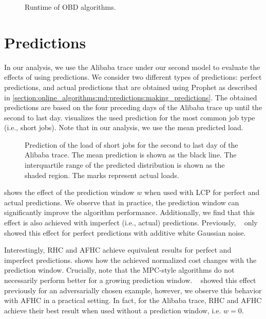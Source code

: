 \begin{figure}
    \centering
    
    \caption{Runtime of OBD algorithms.}\label{fig:case_studies:md:obd:runtimes}
\end{figure}

\section{Predictions}

In our analysis, we use the Alibaba trace under our second model to evaluate the effects of using predictions. We consider two different types of predictions: perfect predictions, and actual predictions that are obtained using Prophet as described in \cref{section:online_algorithms:md:predictions:making_predictions}. The obtained predictions are based on the four preceding days of the Alibaba trace up until the second to last day.  visualizes the used prediction for the most common job type (i.e., short jobs). Note that in our analysis, we use the mean predicted load.

\begin{figure}
    \centering
    
    \caption{Prediction of the load of short jobs for the second to last day of the Alibaba trace. The mean prediction is shown as the black line. The interquartile range of the predicted distribution is shown as the shaded region. The marks represent actual loads.}\label{fig:case_studies:predictions:prediction}
\end{figure}

 shows the effect of the prediction window $w$ when used with LCP for perfect and actual predictions. We observe that in practice, the prediction window can significantly improve the algorithm performance. Additionally, we find that this effect is also achieved with imperfect (i.e., actual) predictions. Previously, \citeauthor{Lin2011}~\cite{Lin2011} only showed this effect for perfect predictions with additive white Gaussian noise.

Interestingly, RHC and AFHC achieve equivalent results for perfect and imperfect predictions.  shows how the achieved normalized cost changes with the prediction window. Crucially, note that the MPC-style algorithms do not necessarily perform better for a growing prediction window. \citeauthor{Lin2012}~\cite{Lin2012} showed this effect previously for an adversarially chosen example, however, we observe this behavior with AFHC in a practical setting. In fact, for the Alibaba trace, RHC and AFHC achieve their best result when used without a prediction window, i.e. $w = 0$.

